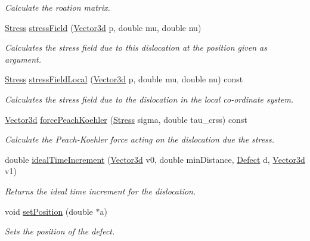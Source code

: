 \begin{DoxyCompactItemize}
\begin{DoxyCompactList}\small\item\em Calculate the roation matrix. \end{DoxyCompactList}\item 
\hyperlink{classStress}{Stress} \hyperlink{classDislocation_af61cedf5305080ce0f55eb7177efe529}{stress\-Field} (\hyperlink{classVector3d}{Vector3d} p, double mu, double nu)
\begin{DoxyCompactList}\small\item\em Calculates the stress field due to this dislocation at the position given as argument. \end{DoxyCompactList}\item 
\hyperlink{classStress}{Stress} \hyperlink{classDislocation_a26f938bfb630c3ba1b13522d7a422b8c}{stress\-Field\-Local} (\hyperlink{classVector3d}{Vector3d} p, double mu, double nu) const 
\begin{DoxyCompactList}\small\item\em Calculates the stress field due to the dislocation in the local co-\/ordinate system. \end{DoxyCompactList}\item 
\hyperlink{classVector3d}{Vector3d} \hyperlink{classDislocation_a9ca3f6fb280edaa1fbf156d75b8f0527}{force\-Peach\-Koehler} (\hyperlink{classStress}{Stress} sigma, double tau\-\_\-crss) const 
\begin{DoxyCompactList}\small\item\em Calculate the Peach-\/\-Koehler force acting on the dislocation due the stress. \end{DoxyCompactList}\item 
double \hyperlink{classDislocation_ab79ff28442fea06055020a2bba087f78}{ideal\-Time\-Increment} (\hyperlink{classVector3d}{Vector3d} v0, double min\-Distance, \hyperlink{classDefect}{Defect} d, \hyperlink{classVector3d}{Vector3d} v1)
\begin{DoxyCompactList}\small\item\em Returns the ideal time increment for the dislocation. \end{DoxyCompactList}\item 
void \hyperlink{classDefect_a2d233d13a8a93f6fba463a1fbc1c6c9f}{set\-Position} (double $\ast$a)
\begin{DoxyCompactList}\small\item\em Sets the position of the defect. \end{DoxyCompactList}\item 

\end{DoxyCompactItemize}
